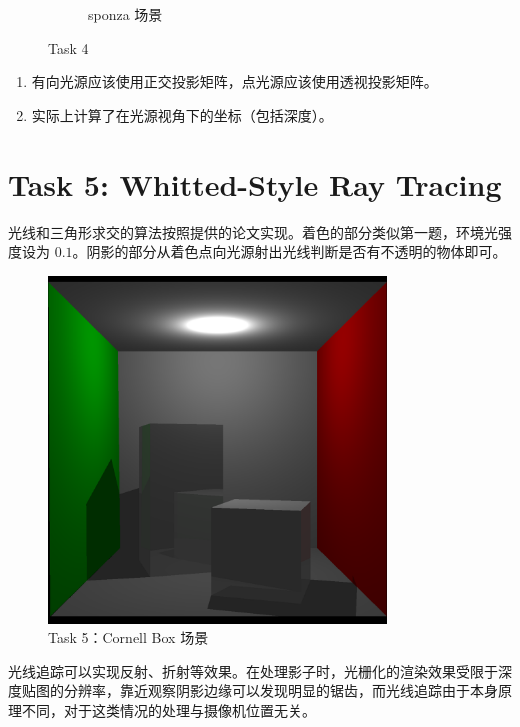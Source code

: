 \documentclass[UTF8]{ctexart}
\begin{document}
\begin{figure}[htbp]
\begin{subfigure}[b]{0.49\textwidth}
        \caption{sponza 场景}
    \end{subfigure}
    \caption*{Task 4}
\end{figure}

\begin{enumerate}
    \item 有向光源应该使用正交投影矩阵，点光源应该使用透视投影矩阵。
    \item 实际上计算了在光源视角下的坐标（包括深度）。
\end{enumerate}

\section*{Task 5: Whitted-Style Ray Tracing}

光线和三角形求交的算法按照提供的论文实现。着色的部分类似第一题，环境光强度设为 $0.1$。阴影的部分从着色点向光源射出光线判断是否有不透明的物体即可。

\begin{figure}[htbp]
    \centering
    \includegraphics[width=0.8\textwidth]{images/5-1.png}
    \caption*{Task 5：Cornell Box 场景}
\end{figure}

光线追踪可以实现反射、折射等效果。在处理影子时，光栅化的渲染效果受限于深度贴图的分辨率，靠近观察阴影边缘可以发现明显的锯齿，而光线追踪由于本身原理不同，对于这类情况的处理与摄像机位置无关。
\end{document}
